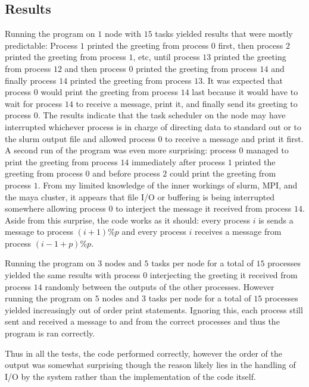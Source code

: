 \documentclass[11pt]{article}
\begin{document}
\subsection{Results}
Running the program on $1$ node with $15$ tasks yielded results that were mostly predictable: Process $1$ printed the greeting from process $0$ first, then process $2$ printed the greeting from process $1$, etc, until process $13$ printed the greeting from process $12$ and then process $0$ printed the greeting from process $14$ and finally process $14$ printed the greeting from process $13$. It was expected that process $0$ would print the greeting from process $14$ last because it would have to wait for process $14$ to receive a message, print it, and finally send its greeting to process $0$. The results indicate that the task scheduler on the node may have interrupted whichever process is in charge of directing data to standard out or to the slurm output file and allowed process $0$ to receive a message and print it first. A second run of the program was even more surprising: process $0$ managed to print the greeting from process $14$ immediately after process $1$ printed the greeting from process $0$ and before process $2$ could print the greeting from process $1$. From my limited knowledge of the inner workings of slurm, MPI, and the maya cluster, it appears that file I/O or buffering is being interrupted somewhere allowing process $0$ to interject the message it received from process $14$. Aside from this surprise, the code works as it should: every process $i$ is sends a message to process $(i+1)\%p$ and every process $i$  receives a message from process $(i-1+p) \% p$.

Running the program on $3$ nodes and $5$ tasks per node for a total of $15$ processes yielded the same results with process $0$ interjecting the greeting it received from process $14$ randomly between the outputs of the other processes. However running the program on $5$ nodes and $3$ tasks per node for a total of $15$ processes yielded increasingly out of order print statements. Ignoring this, each process still sent and received a message to and from the correct processes and thus the program is ran correctly.

Thus in all the tests, the code performed correctly, however the order of the output was somewhat surprising though the reason likely lies in the handling of I/O by the system rather than the implementation of the code itself.
\pagebreak


\pagebreak
\end{document}
